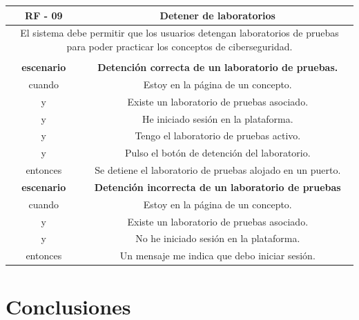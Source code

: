         \begin{table}[!htbp]
            \centering

            \begin{tabular}{|c|c|}
                \hline
                \textbf{RF - 09} & \textbf{Detener de laboratorios} \\
                \hline
                \multicolumn{2}{|p{15cm}|}{
                    El sistema debe permitir que los usuarios detengan laboratorios de pruebas para poder practicar los conceptos de ciberseguridad.
                } \\                    
                \hline
                \multicolumn{2}{|p{15cm}|}{
                } \\
                \hline
                \textbf{escenario} & \textbf{Detención correcta de un laboratorio de pruebas.} \\
                cuando & Estoy en la página de un concepto. \\
                y & Existe un laboratorio de pruebas asociado. \\
                y & He iniciado sesión en la plataforma. \\
                y & Tengo el laboratorio de pruebas activo. \\
                y & Pulso el botón de detención del laboratorio. \\
                entonces & Se detiene el laboratorio de pruebas alojado en un puerto. \\
                \hline
                \textbf{escenario} & \textbf{Detención incorrecta de un laboratorio de pruebas} \\
                cuando & Estoy en la página de un concepto. \\
                y & Existe un laboratorio de pruebas asociado. \\
                y & No he iniciado sesión en la plataforma. \\
                entonces & Un mensaje me indica que debo iniciar sesión. \\
                \hline
            \end{tabular}
        \end{table}

        \newpage
            
    
    \section{Conclusiones}

